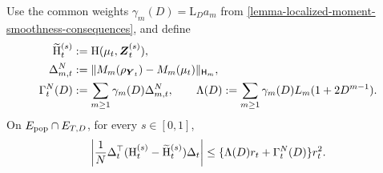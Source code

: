 \begin{lemma}
\label{lemma-directional-measure-slot-error}
Use the common weights $\gamma_m(D)=\mathrm L_Da_m$ from
\cref{lemma-localized-moment-smoothness-consequences}, and define
\begin{align}
 \widetilde{\mathrm{H}}_t^{(s)}
 &:=\mathrm{H}(\mu_t,\boldsymbol{Z}_t^{(s)}),\notag\\
 \Delta_{m,t}^N&:=\|M_m(\rho_{\boldsymbol{Y}_t})-M_m(\mu_t)\|_{\mathsf H_m},\notag\\
 \Gamma_t^N(D)&:=\sum_{m\ge1}\gamma_m(D)\Delta_{m,t}^N,\qquad
 \Lambda(D):=\sum_{m\ge1}\gamma_m(D)L_m(1+2D^{m-1}).
 \label{eq:common-moment-residual-and-lipschitz-sum}
\end{align}
On $E_{\rm pop}\cap E_{T,D}$, for every $s\in[0,1]$,
\begin{equation}
\label{eq-directional-measure-slot-bound}
 \left|\frac1N\Delta_t^\top
    (\mathrm{H}_t^{(s)}-\widetilde{\mathrm{H}}_t^{(s)})\Delta_t\right|
 \le\{\Lambda(D)r_t+\Gamma_t^N(D)\}r_t^2.
\end{equation}
\end{lemma}
